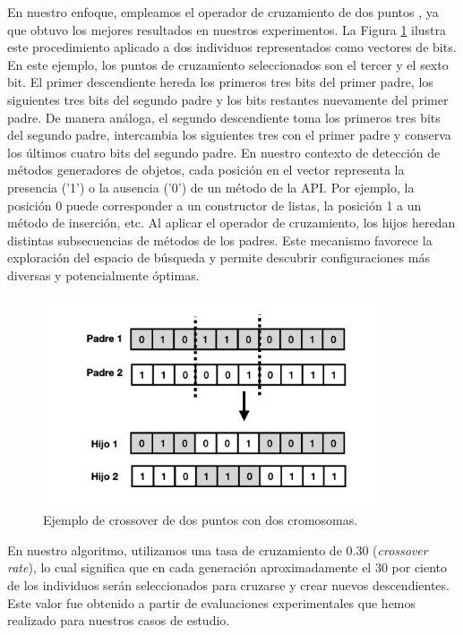 En nuestro enfoque, empleamos el operador de cruzamiento de dos puntos \cite{goldberg1989genetic}, ya que obtuvo los mejores resultados en nuestros experimentos.  
La Figura \ref{fig:crossover} ilustra este procedimiento aplicado a dos individuos representados como vectores de bits.  
En este ejemplo, los puntos de cruzamiento seleccionados son el tercer y el sexto bit.  
El primer descendiente hereda los primeros tres bits del primer padre, los siguientes tres bits del segundo padre y los bits restantes nuevamente del primer padre.  
De manera análoga, el segundo descendiente toma los primeros tres bits del segundo padre, intercambia los siguientes tres con el primer padre y conserva los últimos cuatro bits del segundo padre.  
En nuestro contexto de detección de métodos generadores de objetos, cada posición en el vector representa la presencia ('1') o la ausencia ('0') de un método de la API.  
Por ejemplo, la posición 0 puede corresponder a un constructor de listas, la
posición 1 a un método de inserción, etc.  
Al aplicar el operador de cruzamiento, los hijos heredan distintas subsecuencias de métodos
de los padres. Este mecanismo favorece la exploración del espacio de búsqueda y permite descubrir configuraciones más diversas y potencialmente óptimas. 

\begin{figure}
  \centering
  \includegraphics[width=0.9\textwidth]{images/crossOver.png}
  \caption{Ejemplo de crossover de dos puntos con dos cromosomas.}
  \label{fig:crossover}
\end{figure}


En nuestro algoritmo, utilizamos una tasa de cruzamiento de 0.30 (\emph{crossover rate}), lo cual significa que en cada generación aproximadamente el 30 por ciento de los individuos serán seleccionados para cruzarse y crear nuevos descendientes. Este valor fue obtenido a partir de evaluaciones experimentales que hemos realizado para nuestros casos de estudio.

